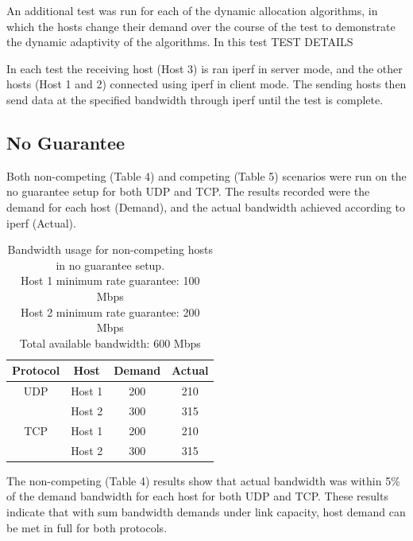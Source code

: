 \documentclass[accepted,single]{gipaper}
\begin{document}
An additional test was run for each of the dynamic allocation algorithms, in which the hosts change their demand over the course of the test to demonstrate the dynamic adaptivity of the algorithms. In this test TEST DETAILS

In each test the receiving host (Host 3) is ran iperf\cite{iperf} in server mode, and the other hosts (Host 1 and 2) connected using iperf in client mode. The sending hosts then send data at the specified bandwidth through iperf until the test is complete.

\subsection{No Guarantee}
\label{no_guar}

Both non-competing (Table 4) and competing (Table 5) scenarios were run on the no guarantee setup for both UDP and TCP. The results recorded were the demand for each host (Demand), and the actual bandwidth achieved according to iperf (Actual). 

\begin{table}[h]
	\label{ng_nc}
	\vspace{-2mm}
	\begin{center}
		\begin{small}
			\begin{tabular}{cccc}
				Protocol & Host & Demand & Actual \\
				\hline
				UDP & Host 1 & 200 & 210\\
				    & Host 2 & 300 & 315\\
				\hline
				TCP & Host 1 & 200 & 210\\
				    & Host 2 & 300 & 315\\
			\end{tabular}
		\end{small}
	\end{center}
	\caption{Bandwidth usage for non-competing hosts in no guarantee setup.\\
	Host 1 minimum rate guarantee: 100 Mbps\\
	Host 2 minimum rate guarantee: 200 Mbps\\	
	Total available bandwidth: 600 Mbps}
	\vspace{-3mm}
\end{table}

The non-competing (Table 4) results show that actual bandwidth was within 5\% of the demand bandwidth for each host for both UDP and TCP. These results indicate that with sum bandwidth demands under link capacity, host demand can be met in full for both protocols.
\end{document}
